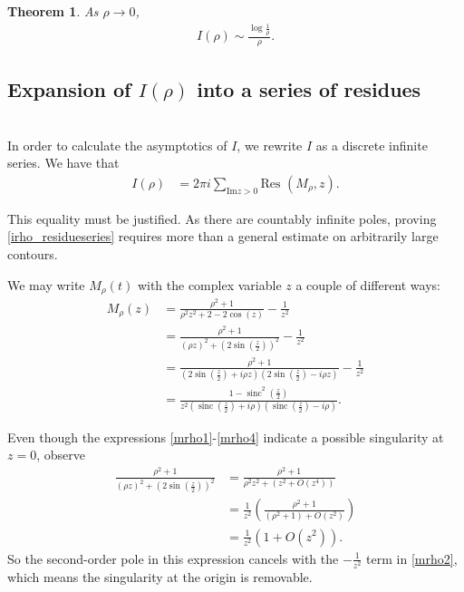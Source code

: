 \documentclass{amsart}
\theoremstyle{plain}
\newtheorem{theorem}{Theorem}
\numberwithin{theorem}{section}
\DeclareMathOperator{\sinc}{sinc}
\theoremstyle{definition}
\theoremstyle{remark}
\theoremstyle{brakets}
\begin{document}
\begin{theorem}
\label{irho_asymptotics}
As $\rho \to 0$,
\begin{align*}
    I(\rho) \sim \frac{\log \frac{1}{\rho}}{\rho}.
\end{align*}
\end{theorem}











\subsection{Expansion of $I(\rho)$ into a series of residues} \label{residueseries}
~\\
In order to calculate the asymptotics of $I$, we rewrite $I$ as a discrete infinite series. We have that
\begin{align}
\label{irho_residueseries}
    I(\rho) &= 2\pi i \sum\limits_{\text{Im} z > 0} \text{Res }(M_\rho,z).
\end{align}

This equality must be justified. As there are countably infinite poles, proving \eqref{irho_residueseries} requires more than a general estimate on arbitrarily large contours.

We may write $M_\rho(t)$ with the complex variable $z$ a couple of different ways:
\begin{subequations}
\begin{align}
    M_\rho(z) &= \frac{\rho^2 + 1}{\rho^2z^2 +2 - 2\cos(z)} - \frac{1}{z^2} \label{mrho1} \\
    &=  \frac{\rho^2 + 1}{(\rho z)^2 + (2\sin(\frac{z}{2}))^2} - \frac{1}{z^2} \label{mrho2} \\
    &= \frac{\rho^2 + 1}{(2\sin({\frac{z}{2}}) + i\rho z)(2\sin(\frac{z}{2})-i\rho z)} - \frac{1}{z^2} \label{mrho3} \\
    &=  \frac{1 - \sinc^2(\frac{z}{2})}{z^2(\sinc(\frac{z}{2})+i\rho)(\sinc(\frac{z}{2})- i\rho)}. \label{mrho4}
\end{align}
\end{subequations}

Even though the expressions \eqref{mrho1}-\eqref{mrho4} indicate a possible singularity at $z = 0$, observe
\begin{align*}
     \frac{\rho^2 + 1}{(\rho z)^2 + (2\sin(\frac{z}{2}))^2} &= \frac{\rho^2+1}{\rho^2z^2 + (z^2 + O(z^4))} \\
     &= \frac{1}{z^2} \left(\frac{\rho^2+1}{(\rho^2 + 1) + O(z^2)}\right) \\
     &= \frac{1}{z^2}(1 + O(z^2)).
\end{align*}
So the second-order pole in this expression cancels with the $-\frac{1}{z^2}$ term in \eqref{mrho2}, which means the singularity at the origin is removable. 
\end{document}
